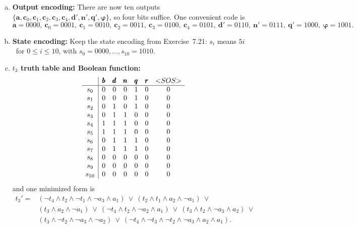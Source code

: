 \begin{enumerate}[{7.}1.]
\begin{enumerate}[(a)]
  \item \textbf{Output encoding:}  There are now ten outputs
  $\{\pmb{a},\pmb{c}_0,\pmb{c}_1,\pmb{c}_2,\pmb{c}_3,\pmb{c}_4,\pmb{d'},
  \pmb{n'},\pmb{q'},\pmb{\varphi}\}$, so four bits suffice.  One convenient code
  is
  \[
    \pmb{a}=0000,\ \pmb{c}_0=0001,\ \pmb{c}_1=0010,\ \pmb{c}_2=0011,\ 
    \pmb{c}_3=0100,\ \pmb{c}_4=0101,\ \pmb{d'}=0110,\ \pmb{n'}=0111,\ 
    \pmb{q'}=1000,\ \pmb{\varphi}=1001.
  \]

  \item \textbf{State encoding:}  Keep the state encoding from Exercise~7.21:
  $s_i$ means $5i$\cent\ for $0\leq i\leq 10$, with
  $s_0=0000,\ldots,s_{10}=1010$.

  \item \textbf{$t_3$ truth table and Boolean function:}
  \[
  \begin{array}{c|cccccc}
  & \pmb{b} & \pmb{d} & \pmb{n} & \pmb{q} & \pmb{r} & \text{\textless}SOS\text{\textgreater} \\
  \hline
  s_0   & 0&0&0&1&0&0\\
  s_1   & 0&0&0&1&0&0\\
  s_2   & 0&1&0&1&0&0\\
  s_3   & 0&1&1&0&0&0\\
  s_4   & 1&1&1&0&0&0\\
  s_5   & 1&1&1&0&0&0\\
  s_6   & 0&1&1&1&0&0\\
  s_7   & 0&1&1&1&0&0\\
  s_8   & 0&0&0&0&0&0\\
  s_9   & 0&0&0&0&0&0\\
  s_{10}& 0&0&0&0&0&0
  \end{array}
  \]
  and one minimized form is
  \[
  \begin{aligned}
  t_3'={}&(\neg t_4\wedge t_2\wedge \neg t_1\wedge \neg a_3\wedge a_1)\ \vee\
          (t_2\wedge t_1\wedge a_2\wedge \neg a_1)\ \vee\\
        &(t_3\wedge a_2\wedge \neg a_1)\ \vee\
          (\neg t_4\wedge t_2\wedge \neg a_2\wedge a_1)\ \vee\
          (t_3\wedge t_2\wedge \neg a_3\wedge a_2)\ \vee\\
        &(t_3\wedge \neg t_2\wedge \neg a_3\wedge \neg a_2)\ \vee\
          (\neg t_4\wedge \neg t_3\wedge \neg t_2\wedge \neg a_3\wedge a_2\wedge a_1).
  \end{aligned}
  \]


\end{enumerate}
\end{enumerate}
